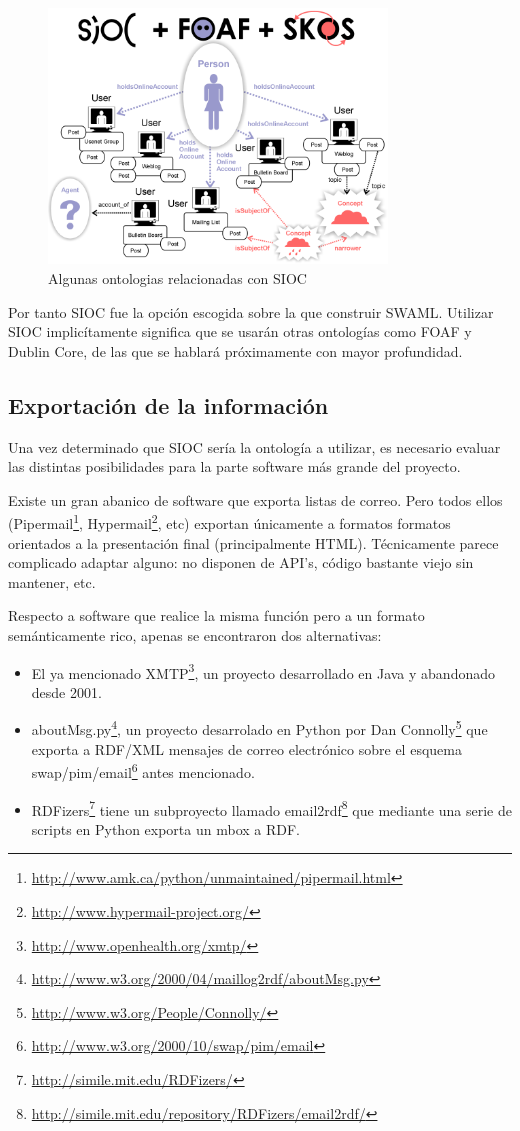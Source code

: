 \begin{figure}[H]
	\centering
	\includegraphics[width=9cm]{images/sioc-foaf-skos.png}
	\caption{Algunas ontologias relacionadas con SIOC}
	\label{fig:sioc+foaf+skos}
\end{figure}

Por tanto SIOC fue la opción escogida sobre la que construir SWAML. Utilizar SIOC
implicítamente significa que se usarán otras ontologías como FOAF y Dublin Core,
de las que se hablará próximamente con mayor profundidad.


\subsection{Exportación de la información}

Una vez determinado que SIOC sería la ontología a utilizar, es necesario evaluar
las distintas posibilidades para la parte software más grande del proyecto.

Existe un gran abanico de software que exporta listas de correo. Pero todos
ellos (Pipermail\footnote{\url{http://www.amk.ca/python/unmaintained/pipermail.html}},
Hypermail\footnote{\url{http://www.hypermail-project.org/}}, etc) exportan únicamente
a formatos formatos orientados a la presentación final (principalmente HTML). 
Técnicamente parece complicado adaptar alguno: no disponen de API's, código bastante
viejo sin mantener, etc.

Respecto a software que realice la misma función pero a un formato semánticamente 
rico, apenas se encontraron dos alternativas:

\begin{itemize}
  \item El ya mencionado XMTP\footnote{\url{http://www.openhealth.org/xmtp/}}, un
	proyecto desarrollado en Java y abandonado desde 2001.
  \item aboutMsg.py\footnote{\url{http://www.w3.org/2000/04/maillog2rdf/aboutMsg.py}}, un
	proyecto desarrolado en Python por Dan Connolly\footnote{\url{http://www.w3.org/People/Connolly/}}
	que exporta a RDF/XML mensajes de correo electrónico sobre el esquema 
	swap/pim/email\footnote{\url{http://www.w3.org/2000/10/swap/pim/email}}
	antes mencionado.
  \item RDFizers\footnote{\url{http://simile.mit.edu/RDFizers/}} tiene un subproyecto
	llamado email2rdf\footnote{\url{http://simile.mit.edu/repository/RDFizers/email2rdf/}}
	que mediante una serie de scripts en Python exporta un mbox a RDF.
\end{itemize}

